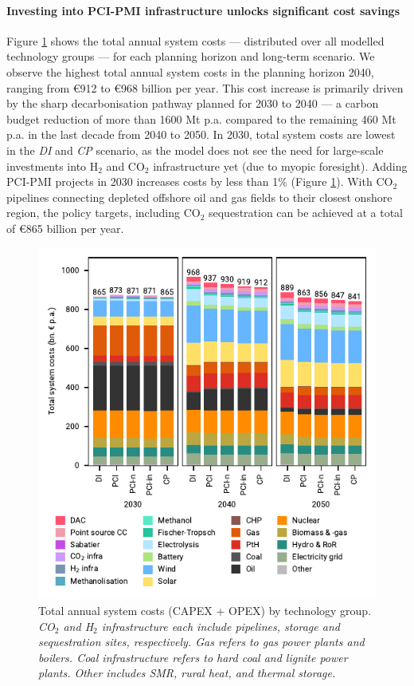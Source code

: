\documentclass[pdflatex,sn-nature]{sn-jnl}%
\theoremstyle{thmstyleone}%
\theoremstyle{thmstyletwo}%
\theoremstyle{thmstylethree}%
\begin{document}
\paragraph{Investing into PCI-PMI infrastructure unlocks significant cost savings}
Figure \ref{fig:costs_overview} shows the total annual system costs --- distributed over all modelled technology groups --- for each planning horizon and long-term scenario. We observe the highest total annual system costs in the planning horizon 2040, ranging from €912 to €968 billion per year. This cost increase is primarily driven by the sharp decarbonisation pathway planned for 2030 to 2040 --- a carbon budget reduction of more than 1600 Mt p.a. compared to the remaining 460 Mt p.a. in the last decade from 2040 to 2050. In 2030, total system costs are lowest in the \textit{DI} and \textit{CP} scenario, as the model does not see the need for large-scale investments into H$_2$ and CO$_2$ infrastructure yet (due to myopic foresight). Adding PCI-PMI projects in 2030 increases costs by less than 1\% (Figure \ref{fig:costs_overview}). With CO$_2$ pipelines connecting depleted offshore oil and gas fields to their closest onshore region, the policy targets, including CO$_2$ sequestration can be achieved at a total of €865 billion per year.

\begin{figure}[htbp]
  \centering
  \includegraphics{figures/costs_overview}
  \caption{Total annual system costs (CAPEX + OPEX) by technology group. \textit{CO$_2$ and H$_2$ infrastructure each include pipelines, storage and sequestration sites, respectively. Gas refers to gas power plants and boilers. Coal infrastructure refers to hard coal and lignite power plants. Other includes SMR, rural heat, and thermal storage.}}
  \label{fig:costs_overview}
\end{figure}
\end{document}
